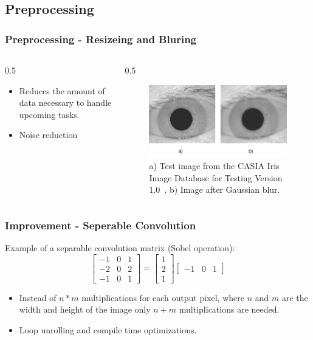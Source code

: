 \documentclass{beamer}
\begin{document}
\subsection{Preprocessing} 
\begin{frame}
	[fragile] \frametitle{Preprocessing - Resizeing and Bluring} 
	\begin{columns}
		\begin{column}
			{0.5
			\textwidth} 
			\begin{itemize}
				\item Reduces the amount of data necessary to handle upcoming tasks. 
				\item Noise reduction 
			\end{itemize}
		\end{column}
		\begin{column}
			{0.5
			\textwidth} 
			\begin{figure}
				[ht] \centering 
				\includegraphics[width=0.99
				\textwidth]{../report/iris/resized.jpg} \caption{a) Test image from the CASIA Iris Image Database for Testing Version 1.0~\cite{ir-testv1}. b) Image after Gaussian blur.} \label{fig:input} 
			\end{figure}
		\end{column}
	\end{columns}
\end{frame}
\begin{frame}
	[fragile] \frametitle{Improvement - Seperable Convolution} Example of a separable convolution matrix (Sobel operation): $$
	\begin{bmatrix}
		-1&0&1\\-2&0&2\\-1&0&1
	\end{bmatrix}
	=
	\begin{bmatrix}
		1\\2\\1
	\end{bmatrix}
	\begin{bmatrix}
		-1&0&1
	\end{bmatrix}
	$$ 
	\begin{itemize}
		\item Instead of $n*m$ multiplications for each output pixel, where $n$ and $m$ are the width and height of the image only $n+m$ multiplications are needed. 
		\item Loop unrolling and compile time optimizations. 
	\end{itemize}
\end{frame}
\end{document}
